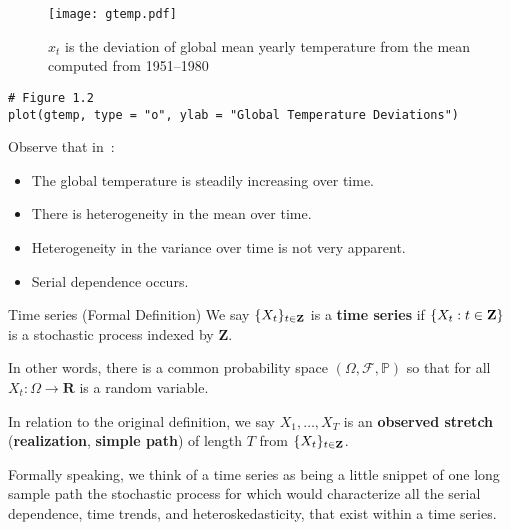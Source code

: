 \begin{figure}[!ht]
    \centering
    \texttt{[image: gtemp.pdf]}
    \caption{$ x_t $ is the deviation of global mean
        yearly temperature from the mean computed from 1951--1980}\label{fig:gtemp}
\end{figure}
\begin{verbatim}
# Figure 1.2
plot(gtemp, type = "o", ylab = "Global Temperature Deviations")
\end{verbatim}
Observe that in~:
\begin{itemize}
    \item The global temperature is steadily increasing over time.
    \item There is heterogeneity in the mean over time.
    \item Heterogeneity in the variance over time is not very apparent.
    \item Serial dependence occurs.
\end{itemize}

\begin{Definition}{Time series (Formal Definition)}{}
    We say $ \{X_t\}_{t\in\mathbf{Z}} $
    is a \textbf{time series} if $ \{X_t : t\in\mathbf{Z}\} $
    is a stochastic process indexed by $ \mathbf{Z} $.
\end{Definition}
In other words, there is a common probability space
$ (\Omega,\mathcal{F},\mathbb{P}) $ so that for all
$ X_t:\Omega\to\mathbf{R} $ is a random variable.

In relation to the original definition, we say
$ X_1,\ldots,X_T $ is an \textbf{observed stretch} (\textbf{realization},
\textbf{simple path}) of length $ T $ from $ \{X_t\}_{t\in\mathbf{Z}} $.

    {\color{blue}Formally speaking, we think of a time series as being a little snippet
        of one long sample path the stochastic process for which would characterize
        all the serial dependence, time trends, and heteroskedasticity,
        that exist within a time series.}


